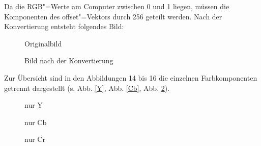 \documentclass[a4paper,12pt,abstracton,titlepage]{scrartcl}
\begin{document}
Da die RGB"=Werte am Computer zwischen 0 und 1 liegen, müssen die Komponenten des offset"=Vektors durch 256 geteilt werden. Nach der Konvertierung entsteht folgendes Bild:

\begin{figure}[htbp]
\begin{minipage}[t]{0.48\textwidth}
  \begin{center}
    \caption{Originalbild}
    \label{originalY}
  \end{center}
\end{minipage}
\begin{minipage}[t]{0.52\textwidth}
  \begin{center}
    \caption{Bild nach der Konvertierung}
    \label{rgb2ycbcr}
  \end{center}
\end{minipage}
\end{figure}
Zur Übersicht sind in den Abbildungen 14 bis 16 die einzelnen Farbkomponenten getrennt dargestellt (s. Abb. \ref{Y}, Abb. \ref{Cb}, Abb. \ref{Cr}).


\begin{figure}[htbp]
\begin{minipage}[t]{0.31\textwidth}
  \begin{center}
    \caption{nur Y}
    \label{Y}
  \end{center}
\end{minipage}
\begin{minipage}[t]{0.31\textwidth}
  \begin{center}
    \caption{nur Cb}
    \label{Cb}
  \end{center}
\end{minipage}
\begin{minipage}[t]{0.31\textwidth}
  \begin{center}
    \caption{nur Cr}
    \label{Cr}
  \end{center}
\end{minipage}
\end{figure}
\end{document}
